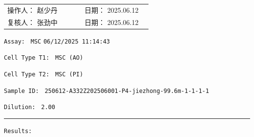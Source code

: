 \documentclass[UTF8,10pt,a4paper,fontset=fandol]{ctexart}
\newcommand{\fieldvalue}[1]{#1}
\newcommand{\handwritten}[1]{#1}
\begin{document}
\vfill

\noindent
\begin{tabular}{@{}p{0.48\linewidth}p{0.42\linewidth}@{}}
操作人：
\fieldvalue{\handwritten{赵少丹}}
&
日期：
\fieldvalue{\handwritten{2025.06.12}}
\\[0.8em]
复核人：
\fieldvalue{\handwritten{张劲中}}
&
日期：
\fieldvalue{\handwritten{2025.06.12}}
\end{tabular}

\newpage

\noindent
\texttt{Assay: }
\fieldvalue{\texttt{MSC}}
\hfill
\texttt{06/12/2025 11:14:43}

\medskip

\noindent
\texttt{Cell Type T1: }
\fieldvalue{\texttt{MSC (AO)}}

\noindent
\texttt{Cell Type T2: }
\fieldvalue{\texttt{MSC (PI)}}

\medskip

\noindent
\texttt{Sample ID: }
\fieldvalue{\texttt{250612-A332Z202506001-P4-jiezhong-99.6m-1-1-1-1}}

\noindent
\texttt{Dilution: }
\fieldvalue{\texttt{2.00}}

\bigskip
\hrule
\bigskip

\noindent\texttt{Results:}

\medskip
\end{document}
